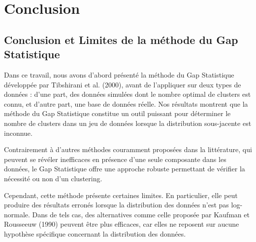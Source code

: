 \chapter{Conclusion}

\startcontents[Conslusion]
\section*{Conclusion et Limites de la méthode du Gap Statistique}

Dans ce travail, nous avons d'abord présenté la méthode du Gap Statistique développée par Tibshirani et al. (2000), avant de l'appliquer sur deux types de données : d'une part, des données simulées dont le nombre optimal de clusters est connu, et d'autre part, une base de données réelle. Nos résultats montrent que la méthode du Gap Statistique constitue un outil puissant pour déterminer le nombre de clusters dans un jeu de données lorsque la distribution sous-jacente est inconnue.

Contrairement à d'autres méthodes couramment proposées dans la littérature, qui peuvent se révéler inefficaces en présence d'une seule composante dans les données, le Gap Statistique offre une approche robuste permettant de vérifier la nécessité ou non d'un clustering.

Cependant, cette méthode présente certaines limites. En particulier, elle peut produire des résultats erronés lorsque la distribution des données n'est pas log-normale. Dans de tels cas, des alternatives comme celle proposée par Kaufman et Rousseeuw (1990) peuvent être plus efficaces, car elles ne reposent sur aucune hypothèse spécifique concernant la distribution des données.
